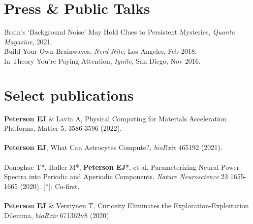 \documentclass[margin,line]{res}
\begin{document}
\begin{resume}
\vspace{-.2cm}
\section{\sc Press \& Public Talks}
Brain's `Background Noise' May Hold Clues to Persistent Mysteries, \emph{Quanta Magazine}, 2021. \\
Build Your Own Brainwaves, \emph{Nerd Nite}, Los Angeles, Feb 2018. \\
In Theory You're Paying Attention, \emph{Ignite}, San Diego, Nov 2016. \\
    
\vspace{-.5cm} 
\section{\sc Select publications}

\textbf{Peterson EJ} \& Lavin A, Physical Computing for Materials Acceleration Platforms, Matter 5, 3586-3596 (2022).
\\ 
\vspace{-.35cm} 
\\
\textbf{Peterson EJ}, What Can Astrocytes Compute?, \emph{bioRxiv} 465192 (2021).
\\ 
\vspace{-.35cm} 
\\
Donoghue T*, Haller M*, \textbf{Peterson EJ}*, et al, Parameterizing Neural Power Spectra into Periodic and Aperiodic Components, \emph{Nature Neuroscience} 23 1655-1665 (2020). [*]: Co-first. 
\\ 
\vspace{-.35cm} 
\\
\textbf{Peterson EJ} \& Verstynen T, Curiosity Eliminates the Exploration-Exploitation Dilemma, \emph{bioRxiv} 671362v8 (2020). 


\end{resume}
\end{document}
